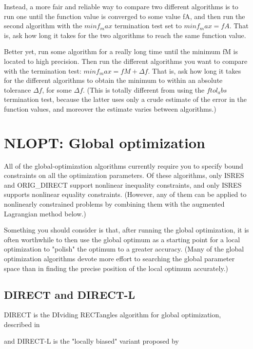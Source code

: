 Instead, a more fair and reliable way to compare two different algorithms is to run one until the function value is converged to some value fA, and then run the second algorithm with the $minf_max$ termination test set to $minf_max=fA$. That is, ask how long it takes for the two algorithms to reach the same function value. 

Better yet, run some algorithm for a really long time until the minimum fM is located to high precision. Then run the different algorithms you want to compare with the termination test: $minf_max=fM+\Delta f$. That is, ask how long it takes for the different algorithms to obtain the minimum to within an absolute tolerance $\Delta f$, for some $\Delta f$. (This is totally different from using the $ftol_abs$ termination test, because the latter uses only a crude estimate of the error in the function values, and moreover the estimate varies between algorithms.) 




\section{NLOPT: Global optimization}
All of the global-optimization algorithms currently require you to specify bound constraints on all the optimization parameters. Of these algorithms, only ISRES and ORIG\_DIRECT support nonlinear inequality constraints, and only ISRES supports nonlinear equality constraints. (However, any of them can be applied to nonlinearly constrained problems by combining them with the augmented Lagrangian method below.) 

Something you should consider is that, after running the global optimization, it is often worthwhile to then use the global optimum as a starting point for a local optimization to "polish" the optimum to a greater accuracy. (Many of the global optimization algorithms devote more effort to searching the global parameter space than in finding the precise position of the local optimum accurately.) 




\subsection{DIRECT and DIRECT-L}
DIRECT is the DIviding RECTangles algorithm for global optimization, described in \cite{Jones_1993}

and DIRECT-L is the "locally biased" variant proposed by \cite{Gablonsky_2001}

